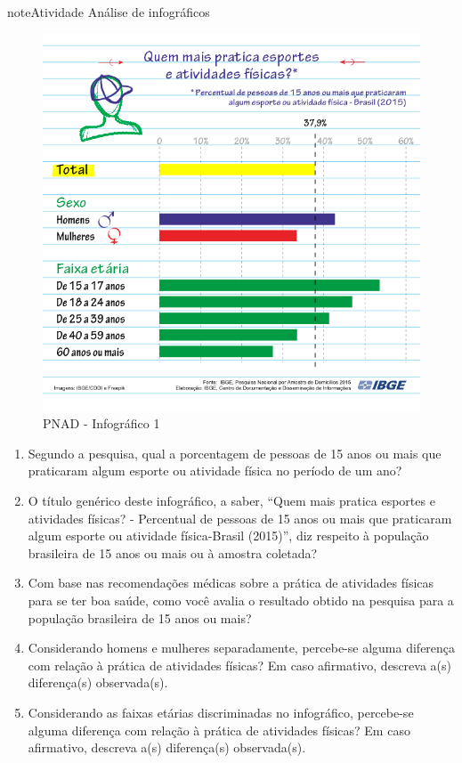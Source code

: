 \begin{sphinxadmonition}{note}{Atividade}{ Análise de infográficos}
\begin{figure}[H]
\noindent\includegraphics[width=300bp]{PNAD_2015_Esportes_01quem2.png}
\caption{PNAD - Infográfico 1}\label{\detokenize{PE103-0:fig-infografico-pnad-1}}\label{\detokenize{PE103-0:id1}}\end{figure}
\begin{enumerate}
\item {} 
Segundo a pesquisa, qual a porcentagem de pessoas de 15 anos ou mais que praticaram algum esporte ou atividade física no período de um ano?

\item {} 
O título genérico deste infográfico, a saber, ``Quem mais pratica esportes e atividades físicas? - Percentual de pessoas de 15 anos ou mais que praticaram algum esporte ou atividade física-Brasil (2015)'', diz respeito à população brasileira de 15 anos ou mais ou à amostra coletada?

\item {} 
Com base nas recomendações médicas sobre a prática de atividades físicas para se ter boa saúde, como você avalia o resultado obtido na pesquisa para a população brasileira de 15 anos ou mais?

\item {} 
Considerando homens e mulheres separadamente, percebe-se alguma diferença com relação à prática de atividades físicas? Em caso afirmativo, descreva a(s) diferença(s) observada(s).

\item {} 
Considerando as faixas etárias discriminadas no infográfico, percebe-se alguma diferença com relação à prática de atividades físicas? Em caso afirmativo, descreva a(s) diferença(s) observada(s).


\end{enumerate}
\end{sphinxadmonition}
